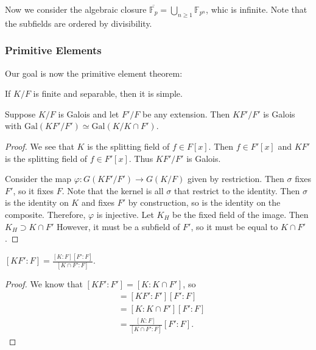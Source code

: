 \documentclass[10pt, twoside]{article}
\newcommand{\F}{\mathbb{F}}
\begin{document}
        Now we consider the algebraic closure $\overline{\F_p} = \bigcup_{n \geq 1} \F_{p^n}$, whic is infinite. Note that the subfields are ordered by divisibility.

        \subsubsection{Primitive Elements}

        Our goal is now the primitive element theorem:
        \begin{thm}
            If $K/F$ is finite and separable, then it is simple.
        \end{thm}

        \begin{prop}
            Suppose $K/F$ is Galois and let $F'/F$ be any extension. Then $KF'/F'$ is Galois with $\mathrm{Gal}(KF'/F') \simeq \mathrm{Gal}(K/K\cap F')$.
            \begin{proof}
                We see that $K$ is the splitting field of $f \in F[x]$. Then $f \in F'[x]$ and $KF'$ is the splitting field of $f \in F'[x]$. Thus $KF'/F'$ is Galois.

                Consider the map $\varphi: G(KF'/F') \to G(K/F)$ given by restriction. Then $\sigma$ fixes $F'$, so it fixes $F$. Note that the kernel is all $\sigma$ that restrict to the identity. Then $\sigma$ is the identity on $K$ and fixes $F'$ by construction, so is the identity on the composite. Therefore, $\varphi$ is injective. Let $K_H$ be the fixed field of the image. Then $K_H \supset K \cap F'$ However, it must be a subfield of $F'$, so it must be equal to $K \cap F'$.
            \end{proof}
        \end{prop}

        \begin{cor}
            $[KF':F] = \frac{[K:F][F':F]}{[K\cap F':F]}$.
            \begin{proof}
                We know that $[KF':F'] = [K:K\cap F']$, so
                \begin{align*}
                    [KF':F] &= [KF':F'][F':F] \\
                            &= [K:K\cap F'][F':F] \\
                            &= \frac{[K:F]}{[K \cap F':F]} [F':F].
                \end{align*}
            \end{proof}
        \end{cor}
\end{document}
